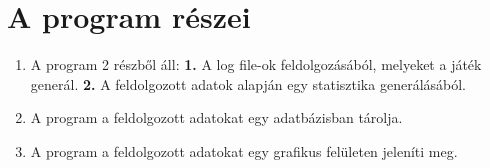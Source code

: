 \documentclass{scrreprt}
\begin{document}
    \chapter{A program részei}\label{ch:a-program-reszei}
    \begin{enumerate}[label=\thechapter.\arabic*.]
        \item A program 2 részből áll:
        \subitem \textbf{1.} A log file-ok feldolgozásából, melyeket a játék generál.
        \subitem \textbf{2.} A feldolgozott adatok alapján egy statisztika generálásából.
        \item A program a feldolgozott adatokat egy adatbázisban tárolja.
        \item A program a feldolgozott adatokat egy grafikus felületen jeleníti meg.
    \end{enumerate}
\end{document}
